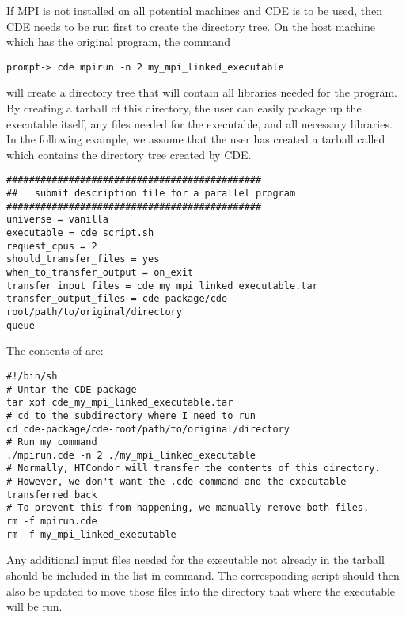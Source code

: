 If MPI is not installed on all potential machines and CDE is to be used,
then CDE needs to be run first to create the directory tree. On the host machine
which has the original program, the command

\begin{verbatim}
prompt-> cde mpirun -n 2 my_mpi_linked_executable
\end{verbatim}

will create a directory tree that will contain all libraries needed for the 
program. By creating a tarball of this directory, the user can easily package up
the executable itself, any files needed for the executable, and all necessary
libraries. In the following example, we assume that the user has created a 
tarball called  which contains the 
directory tree created by CDE.

\begin{verbatim}
#############################################
##   submit description file for a parallel program
#############################################
universe = vanilla
executable = cde_script.sh
request_cpus = 2
should_transfer_files = yes
when_to_transfer_output = on_exit
transfer_input_files = cde_my_mpi_linked_executable.tar
transfer_output_files = cde-package/cde-root/path/to/original/directory
queue
\end{verbatim}

The contents of  are:
\begin{verbatim}
#!/bin/sh
# Untar the CDE package
tar xpf cde_my_mpi_linked_executable.tar
# cd to the subdirectory where I need to run
cd cde-package/cde-root/path/to/original/directory
# Run my command
./mpirun.cde -n 2 ./my_mpi_linked_executable
# Normally, HTCondor will transfer the contents of this directory.
# However, we don't want the .cde command and the executable transferred back
# To prevent this from happening, we manually remove both files.
rm -f mpirun.cde
rm -f my_mpi_linked_executable
\end{verbatim}

Any additional input files needed for the executable not already in the tarball
should be included in the list in  command. 
The corresponding script should then also be updated to move those files into
the directory that where the executable will be run.


